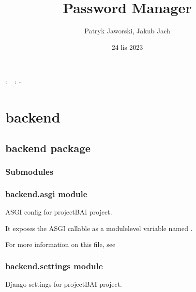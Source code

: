 \documentclass[letterpaper,10pt,polish]{sphinxmanual}
\title{Password Manager}
\date{24 lis 2023}
\author{Patryk Jaworski, Jakub Jach}
\begin{document}
\ifdefined\shorthandoff
  \ifnum\catcode`\=\string=\active\shorthandoff{=}\fi
  \ifnum\catcode`\"=\active{}\fi
\fi

\pagestyle{empty}
\sphinxmaketitle
\pagestyle{plain}
\sphinxtableofcontents
\pagestyle{normal}
\label{\detokenize{index::doc}}


\sphinxstepscope


\chapter{backend}
\label{\detokenize{modules:backend}}\label{\detokenize{modules::doc}}
\sphinxstepscope


\section{backend package}
\label{\detokenize{backend:backend-package}}\label{\detokenize{backend::doc}}

\subsection{Submodules}
\label{\detokenize{backend:submodules}}

\subsection{backend.asgi module}
\label{\detokenize{backend:module-backend.asgi}}\label{\detokenize{backend:backend-asgi-module}}
\sphinxAtStartPar
ASGI config for projectBAI project.

\sphinxAtStartPar
It exposes the ASGI callable as a module\sphinxhyphen{}level variable named .

\sphinxAtStartPar
For more information on this file, see


\subsection{backend.settings module}
\label{\detokenize{backend:module-backend.settings}}\label{\detokenize{backend:backend-settings-module}}
\sphinxAtStartPar
Django settings for projectBAI project.
\end{document}
